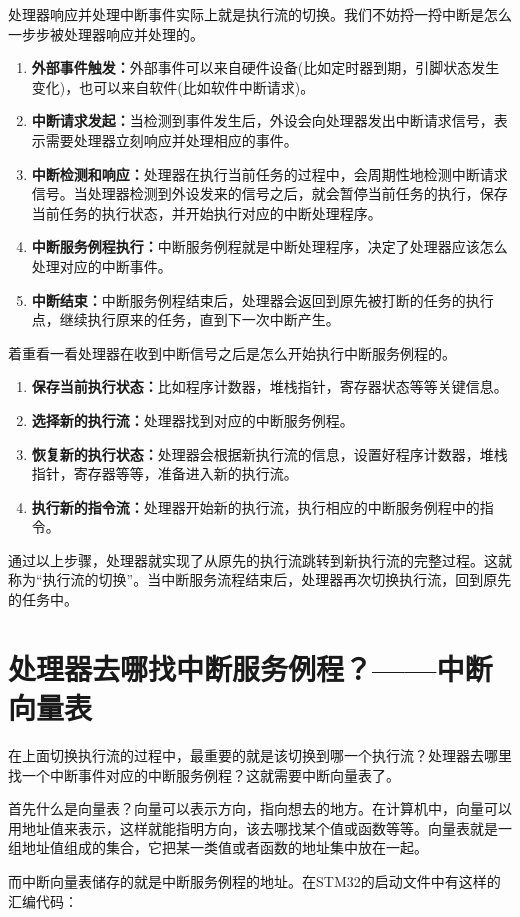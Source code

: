 处理器响应并处理中断事件实际上就是执行流的切换。我们不妨捋一捋中断是怎么一步步被处理器响应并处理的。
\begin{enumerate}
    \item {\bf 外部事件触发：}外部事件可以来自硬件设备(比如定时器到期，引脚状态发生变化)，也可以来自软件(比如软件中断请求)。
    \item {\bf 中断请求发起：}当检测到事件发生后，外设会向处理器发出中断请求信号，表示需要处理器立刻响应并处理相应的事件。
    \item {\bf 中断检测和响应：}处理器在执行当前任务的过程中，会周期性地检测中断请求信号。当处理器检测到外设发来的信号之后，就会暂停当前任务的执行，保存当前任务的执行状态，并开始执行对应的中断处理程序。
    \item {\bf 中断服务例程执行：}中断服务例程就是中断处理程序，决定了处理器应该怎么处理对应的中断事件。
    \item {\bf 中断结束：}中断服务例程结束后，处理器会返回到原先被打断的任务的执行点，继续执行原来的任务，直到下一次中断产生。
\end{enumerate}
着重看一看处理器在收到中断信号之后是怎么开始执行中断服务例程的。
\begin{enumerate}
    \item {\bf 保存当前执行状态：}比如程序计数器，堆栈指针，寄存器状态等等关键信息。
    \item {\bf 选择新的执行流：}处理器找到对应的中断服务例程。
    \item {\bf 恢复新的执行状态：}处理器会根据新执行流的信息，设置好程序计数器，堆栈指针，寄存器等等，准备进入新的执行流。
    \item {\bf 执行新的指令流：}处理器开始新的执行流，执行相应的中断服务例程中的指令。
\end{enumerate}
通过以上步骤，处理器就实现了从原先的执行流跳转到新执行流的完整过程。这就称为“执行流的切换”。当中断服务流程结束后，处理器再次切换执行流，回到原先的任务中。
\section{处理器去哪找中断服务例程？——中断向量表}
在上面切换执行流的过程中，最重要的就是该切换到哪一个执行流？处理器去哪里找一个中断事件对应的中断服务例程？这就需要中断向量表了。

首先什么是向量表？向量可以表示方向，指向想去的地方。在计算机中，向量可以用地址值来表示，这样就能指明方向，该去哪找某个值或函数等等。向量表就是一组地址值组成的集合，它把某一类值或者函数的地址集中放在一起。

而中断向量表储存的就是中断服务例程的地址。在STM32的启动文件中有这样的汇编代码：

